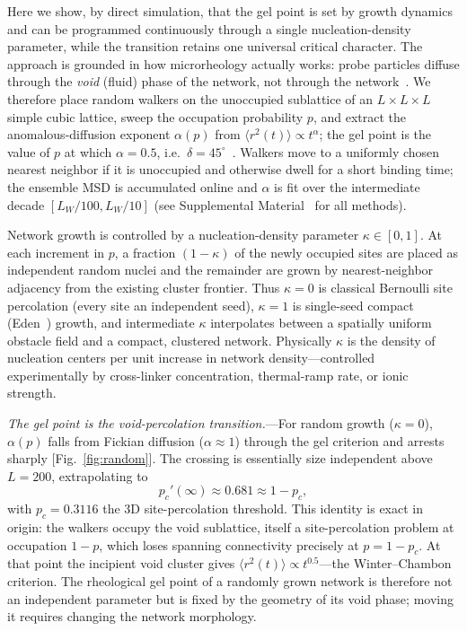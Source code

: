 \documentclass[aps,prl,twocolumn,superscriptaddress,floatfix,nofootinbib]{revtex4-2}
\newcommand{\msd}{\langle r^2(t)\rangle}
\newcommand{\pc}{p_c}
\newcommand{\pcp}{p_c'}
\newcommand{\kap}{\kappa}
\begin{document}
Here we show, by direct simulation, that the gel point is set by growth dynamics and can be programmed continuously through a single nucleation-density parameter, while the transition retains one universal critical character. The approach is grounded in how microrheology actually works: probe particles diffuse through the \emph{void} (fluid) phase of the network, not through the network~\cite{deBruyn2013,Rich2011,Oppong2006}. We therefore place random walkers on the unoccupied sublattice of an $L\times L\times L$ simple cubic lattice, sweep the occupation probability $p$, and extract the anomalous-diffusion exponent $\alpha(p)$ from $\msd\propto t^{\alpha}$; the gel point is the value of $p$ at which $\alpha=0.5$, i.e.\ $\delta=45^{\circ}$~\cite{Winter1987,Chambon1987,Muthukumar1989}. Walkers move to a uniformly chosen nearest neighbor if it is unoccupied and otherwise dwell for a short binding time; the ensemble MSD is accumulated online and $\alpha$ is fit over the intermediate decade $[L_W/100,L_W/10]$ (see Supplemental Material~\cite{SM} for all methods).

Network growth is controlled by a nucleation-density parameter $\kap\in[0,1]$. At each increment in $p$, a fraction $(1-\kap)$ of the newly occupied sites are placed as independent random nuclei and the remainder are grown by nearest-neighbor adjacency from the existing cluster frontier. Thus $\kap=0$ is classical Bernoulli site percolation (every site an independent seed), $\kap=1$ is single-seed compact (Eden~\cite{Eden1961}) growth, and intermediate $\kap$ interpolates between a spatially uniform obstacle field and a compact, clustered network. Physically $\kap$ is the density of nucleation centers per unit increase in network density---controlled experimentally by cross-linker concentration, thermal-ramp rate, or ionic strength.

\emph{The gel point is the void-percolation transition.}---For random growth ($\kap=0$), $\alpha(p)$ falls from Fickian diffusion ($\alpha\approx1$) through the gel criterion and arrests sharply [Fig.~\ref{fig:random}]. The crossing is essentially size independent above $L=200$, extrapolating to
\begin{equation}
  \pcp(\infty)\approx0.681 \approx 1-\pc ,
\end{equation}
with $\pc=0.3116$ the 3D site-percolation threshold. This identity is exact in origin: the walkers occupy the void sublattice, itself a site-percolation problem at occupation $1-p$, which loses spanning connectivity precisely at $p=1-\pc$. At that point the incipient void cluster gives $\msd\propto t^{0.5}$---the Winter--Chambon criterion. The rheological gel point of a randomly grown network is therefore not an independent parameter but is fixed by the geometry of its void phase; moving it requires changing the network morphology.
\end{document}
